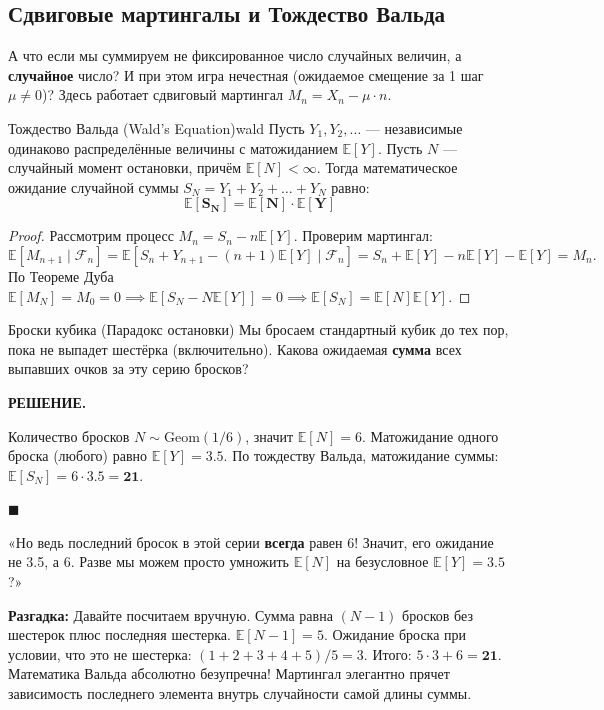 \documentclass[12pt,a4paper]{article}
\newcommand{\E}{\mathbb{E}}
\newcommand{\F}{\mathcal{F}}
\newenvironment{solution}{
    \begin{tcolorbox}[
        enhanced, breakable, blanker,
        borderline west={2.5pt}{0pt}{solgray},
        left=12pt, top=5pt, bottom=5pt,
        before skip=10pt, after skip=15pt
    ]
    \textbf{\textsf{РЕШЕНИЕ.}}\;
}{
    \hfill $\blacksquare$
    \end{tcolorbox}
}
\begin{document}
\subsection{Сдвиговые мартингалы и Тождество Вальда}

А что если мы суммируем не фиксированное число случайных величин, а \textbf{случайное} число? И при этом игра нечестная (ожидаемое смещение за 1 шаг $\mu \neq 0$)? Здесь работает сдвиговый мартингал $M_n = X_n - \mu \cdot n$.

\begin{theorem}{Тождество Вальда (Wald's Equation)}{wald}
Пусть $Y_1, Y_2, \ldots$ --- независимые одинаково распределённые величины с матожиданием $\E[Y]$. Пусть $N$ --- случайный момент остановки, причём $\E[N] < \infty$. Тогда математическое ожидание случайной суммы $S_N = Y_1 + Y_2 + \ldots + Y_N$ равно:
\[ \mathbf{\E[S_N] = \E[N] \cdot \E[Y]} \]
\end{theorem}

\begin{proof}
Рассмотрим процесс $M_n = S_n - n \E[Y]$. Проверим мартингал:
\[ \E[M_{n+1} \mid \F_n] = \E[S_n + Y_{n+1} - (n+1)\E[Y] \mid \F_n] = S_n + \E[Y] - n\E[Y] - \E[Y] = M_n. \]
По Теореме Дуба $\E[M_N] = M_0 = 0 \implies \E[S_N - N \E[Y]] = 0 \implies \E[S_N] = \E[N]\E[Y]$.
\end{proof}

\begin{problem}{Броски кубика (Парадокс остановки)}{}
Мы бросаем стандартный кубик до тех пор, пока не выпадет шестёрка (включительно). Какова ожидаемая \textbf{сумма} всех выпавших очков за эту серию бросков?
\end{problem}
\begin{solution}
Количество бросков $N \sim \text{Geom}(1/6)$, значит $\E[N] = 6$. Матожидание одного броска (любого) равно $\E[Y] = 3.5$. По тождеству Вальда, матожидание суммы: $\E[S_N] = 6 \cdot 3.5 = \mathbf{21}$. 
\end{solution}

\begin{paradox}
«Но ведь последний бросок в этой серии \textbf{всегда} равен 6! Значит, его ожидание не 3.5, а 6. Разве мы можем просто умножить $\E[N]$ на безусловное $\E[Y] = 3.5$?» 

\textbf{Разгадка:} Давайте посчитаем вручную. Сумма равна $(N-1)$ бросков без шестерок плюс последняя шестерка. $\E[N-1] = 5$. Ожидание броска при условии, что это не шестерка: $(1+2+3+4+5)/5 = 3$. 
Итого: $5 \cdot 3 + 6 = \mathbf{21}$. Математика Вальда абсолютно безупречна! Мартингал элегантно прячет зависимость последнего элемента внутрь случайности самой длины суммы.
\end{paradox}
\end{document}

